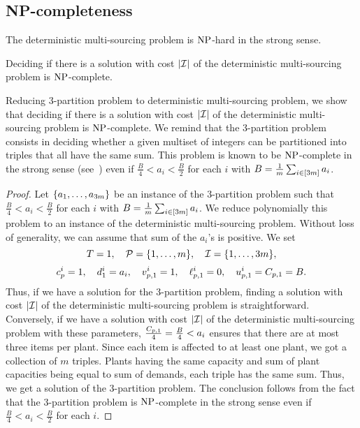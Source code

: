 \subsection{NP-completeness}


The deterministic multi-sourcing problem is $\operatorname{NP}$-hard in the strong sense.


\begin{thm}\label{thm:deterministic-multi-sourcing:strong-NP-hard}
Deciding if there is a solution with cost $\card{\REF}$ of the deterministic multi-sourcing problem is $\operatorname{NP}$-complete.
\end{thm}


Reducing 3-partition problem to deterministic multi-sourcing problem, we show that deciding if there is a solution with cost $\card{\REF}$ of the deterministic multi-sourcing problem is $\operatorname{NP}$-complete. We remind that the 3-partition problem consists in deciding whether a given multiset of integers can be partitioned into triples that all have the same sum. This problem is known to be $\operatorname{NP}$-complete in the strong sense (see~\cite{Garey1979}) even if $\frac{B}{4} < a_i < \frac{B}{2}$ for each $i$ with $B=\frac{1}{m}\sum_{i\in\range{3m}}a_i$.



\begin{proof}
Let $\crbracket{a_1,\ldots,a_{3m}}$ be an instance of the 3-partition problem such that $\frac{B}{4} < a_i < \frac{B}{2}$ for each $i$ with $B=\frac{1}{m}\sum_{i\in\range{3m}}a_i$.
We reduce polynomially this problem to an instance of the deterministic multi-sourcing problem.
Without loss of generality, we can assume that sum of the $a_i$'s is positive.
We set
$$
  \horizon=1
  ,\quad
  \plants=\range[1]{m}
  ,\quad
  \REF=\range[1]{3m},
$$
$$
  c_p^i=1
  ,\quad
  d_1^i=a_i
  ,\quad
  v_{p,1}^i=1
  ,\quad
  \ell_{p,1}^i=0
  ,\quad
  u_{p,1}^i=C_{p,1}=B.
$$
Thus, if we have a solution for the 3-partition problem, finding a solution with cost $\card{\REF}$ of the deterministic multi-sourcing problem is straightforward.
Conversely, if we have a solution with cost $\card{\REF}$ of the deterministic multi-sourcing problem with these parameters, $\frac{C_{p,1}}{4}=\frac{B}{4} < a_i$ ensures that there are at most three items per plant.
Since each item is affected to at least one plant, we got a collection of $m$ triples.
Plants having the same capacity and sum of plant capacities being equal to sum of demands, each triple has the same sum.
Thus, we get a solution of the 3-partition problem.
The conclusion follows from the fact that the 3-partition problem is $\operatorname{NP}$-complete in the strong sense even if $\frac{B}{4} < a_i < \frac{B}{2}$ for each $i$.
\end{proof}


